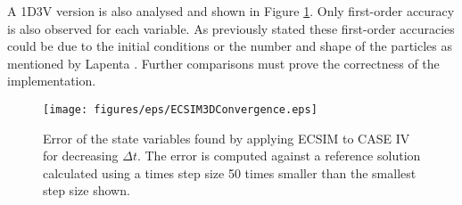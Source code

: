 
A 1D3V version is also analysed and shown in Figure \ref{fig: 1D-3V-convergence}. Only first-order accuracy is also observed for each variable. As previously stated these first-order accuracies could be due to the initial conditions or the number and shape of the particles as mentioned by Lapenta \cite{lapenta_exactly_2017}. Further comparisons must prove the correctness of the implementation.
\begin{figure}[h]
    \centering
    \texttt{[image: figures/eps/ECSIM3DConvergence.eps]}
    \caption{Error of the state variables found by applying ECSIM to CASE IV for decreasing $\Delta t$. The error is computed against a reference solution calculated using a times step size 50 times smaller than the smallest step size shown.}
    \label{fig: 1D-3V-convergence}
\end{figure}
 
